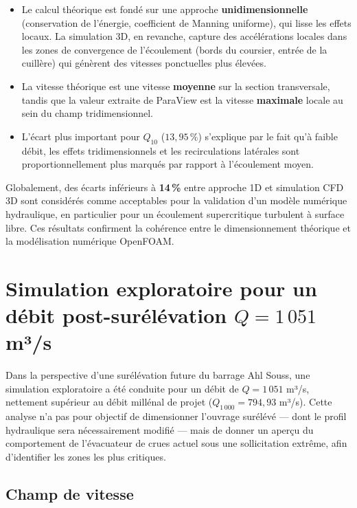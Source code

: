 \begin{itemize}
    \item Le calcul théorique est fondé sur une approche \textbf{unidimensionnelle} (conservation de l'énergie, coefficient de Manning uniforme), qui lisse les effets locaux. La simulation 3D, en revanche, capture des accélérations locales dans les zones de convergence de l'écoulement (bords du coursier, entrée de la cuillère) qui génèrent des vitesses ponctuelles plus élevées.
    \item La vitesse théorique est une vitesse \textbf{moyenne} sur la section transversale, tandis que la valeur extraite de ParaView est la vitesse \textbf{maximale} locale au sein du champ tridimensionnel.
    \item L'écart plus important pour $Q_{10}$ ($13{,}95\,\%$) s'explique par le fait qu'à faible débit, les effets tridimensionnels et les recirculations latérales sont proportionnellement plus marqués par rapport à l'écoulement moyen.
\end{itemize}

Globalement, des écarts inférieurs à \textbf{14\,\%} entre approche 1D et simulation CFD 3D sont considérés comme acceptables pour la validation d'un modèle numérique hydraulique, en particulier pour un écoulement supercritique turbulent à surface libre. Ces résultats confirment la cohérence entre le dimensionnement théorique et la modélisation numérique OpenFOAM.

\section{Simulation exploratoire pour un débit post-surélévation $Q = 1\,051$ m³/s}
\label{sec:resultats_q1051}

Dans la perspective d'une surélévation future du barrage Ahl Souss, une simulation exploratoire a été conduite pour un débit de $Q = 1\,051$ m³/s, nettement supérieur au débit millénal de projet ($Q_{1\,000} = 794{,}93$ m³/s). Cette analyse n'a pas pour objectif de dimensionner l'ouvrage surélévé — dont le profil hydraulique sera nécessairement modifié — mais de donner un aperçu du comportement de l'évacuateur de crues actuel sous une sollicitation extrême, afin d'identifier les zones les plus critiques.

\subsection{Champ de vitesse}
\label{subsec:q1051_vitesse}


